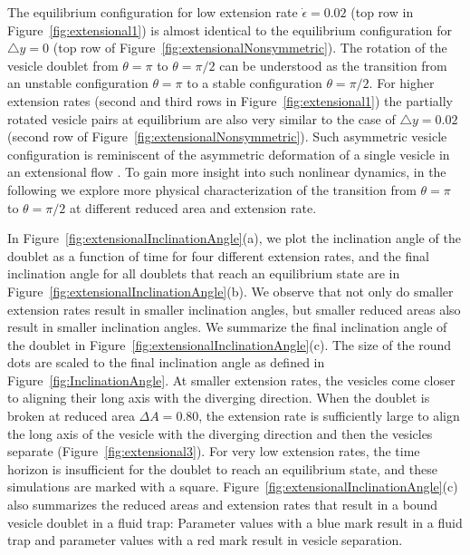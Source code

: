\documentclass[prf,superscriptaddress,showkeys,longbibliography]{revtex4-1}
\begin{document}
%
The equilibrium configuration for low extension rate $\dot\epsilon=0.02$ (top row in Figure~\ref{fig:extensional1}) is
almost identical to the equilibrium configuration for $\triangle y=0$ (top row of  Figure~\ref{fig:extensionalNonsymmetric}).
The rotation of the vesicle doublet 
from $\theta=\pi$ to $\theta=\pi/2$ can be understood as the transition from an unstable configuration $\theta=\pi$ to a stable configuration $\theta=\pi/2$.
For higher extension rates (second and third rows in Figure~\ref{fig:extensional1}) the partially rotated vesicle pairs at equilibrium are
also very similar to the case of $\triangle y=0.02$ (second row of Figure~\ref{fig:extensionalNonsymmetric}).
Such asymmetric vesicle configuration is reminiscent of the asymmetric deformation of a single vesicle in an extensional flow \cite{KantslerSegreSteinberg2008_PRL,Narsimhan2014_JFM,DahlNarsimhanGouveia2016_SoftMatt}.
To gain more insight into such nonlinear dynamics, in the following we explore more physical characterization of the transition from $\theta=\pi$ to $\theta=\pi/2$ at
different reduced area and extension rate.
%

In Figure~\ref{fig:extensionalInclinationAngle}(a), we plot the
inclination angle of the doublet as a function of time for four
different extension rates, and the final inclination angle for all
doublets that reach an equilibrium state are in
Figure~\ref{fig:extensionalInclinationAngle}(b).  We observe that not
only do smaller extension rates result in smaller inclination angles,
but smaller reduced areas also result in smaller inclination angles.  We
summarize the final inclination angle of the doublet in
Figure~\ref{fig:extensionalInclinationAngle}(c).  The size of the round
dots are scaled to the final inclination angle as defined in
Figure~\ref{fig:InclinationAngle}.  At smaller extension rates, the
vesicles come closer to aligning their long axis with the diverging
direction.  When the doublet is broken at reduced area $\Delta A =
0.80$, the extension rate is sufficiently large to align the long axis
of the vesicle with the diverging direction and then the vesicles
separate (Figure~\ref{fig:extensional3}).  For very low extension rates,
the time horizon is insufficient for the doublet to reach an equilibrium
state, and these simulations are marked with a square.
Figure~\ref{fig:extensionalInclinationAngle}(c) also summarizes the
reduced areas and extension rates that result in a bound vesicle doublet
in a fluid trap: Parameter values with a blue mark result in a fluid
trap and parameter values with a red mark result in vesicle separation.
\end{document}
